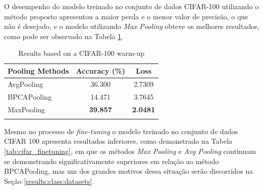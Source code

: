O desempenho do modelo treinado no conjunto de dados CIFAR-100 utilizando o método proposto apresentou a maior perda e o menor valor de precisão, o que não é desejado, e o modelo utilizando \textit{Max Pooling} obteve os melhores resultados, como pode ser observado na Tabela \ref{tab:cifar_values}.

\begin{table}[H]
    \caption{Results based on a CIFAR-100 warm-up}
    \label{tab:cifar_values}
    \centering
    \begin{tabular}{lcc}
        \firsthline
        \textbf{Pooling Methods} & \textbf{Accuracy (\%)} & \textbf{Loss}   \\
        \hline
        AvgPooling               & 36.300                 & 2.7309          \\
        BPCAPooling              & 14.471                 & 3.7645          \\
        MaxPooling               & \textbf{39.857}        & \textbf{2.0481} \\
        \lasthline
    \end{tabular}
\end{table}

Mesmo no processo de \textit{fine-tuning} o modelo treinado no conjunto de dados CIFAR 100 apresenta resultados inferiores, como demonstrado na Tabela \ref{tab:cifar_finetuning}, em que os métodos \textit{Max Pooling} e \textit{Avg Pooling} continuam se demonstrando significativamente superiores em relação ao método BPCAPooling, mas um dos grandes motivos dessa situação serão discorridos na Seção \ref{results:class:datasets}.

